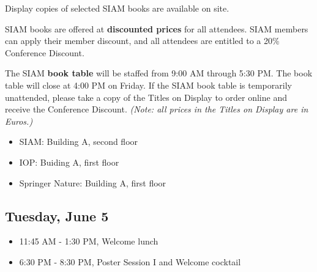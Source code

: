 

\noindent Display copies of selected SIAM books are available on site.

\bigskip

\noindent SIAM books are offered at \textbf{discounted prices} for all attendees. 
SIAM members can apply their member discount, and all attendees are entitled to a 20\% Conference Discount.

\bigskip

\noindent The SIAM \textbf{book table} will be staffed from 9:00 AM through 5:30 PM. 
The book table will close at 4:00 PM on Friday. 
If the SIAM book table is temporarily unattended, please take a copy of the Titles on Display to order online and receive the Conference Discount. 
\textit{(Note: all prices in the Titles on Display are in Euros.)}


\begin{itemize}
  \item SIAM: Building A, second floor
  \item IOP: Buiding A, first floor
  \item Springer Nature: Building A, first floor
\end{itemize}


\subsection*{Tuesday, June 5}

\begin{itemize}
  \item[] 11:45 AM - 1:30 PM, Welcome lunch
  \item[] 6:30 PM - 8:30 PM, Poster Session I and Welcome cocktail
\end{itemize}

